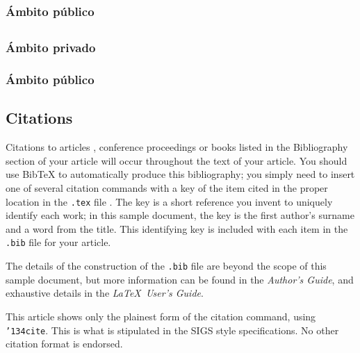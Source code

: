 \documentclass{vldb}
\begin{document}
\subsubsection{Ámbito público}

\subsubsubsection{}

\subsection{}

\subsubsection{Ámbito privado}

\subsubsubsection{}

\subsubsection{Ámbito público}

\subsubsubsection{}


\subsection{Citations}
Citations to articles \cite{bowman:reasoning, clark:pct, braams:babel, herlihy:methodology},
conference
proceedings \cite{clark:pct} or books \cite{salas:calculus, Lamport:LaTeX} listed
in the Bibliography section of your
article will occur throughout the text of your article.
You should use BibTeX to automatically produce this bibliography;
you simply need to insert one of several citation commands with
a key of the item cited in the proper location in
the \texttt{.tex} file \cite{Lamport:LaTeX}.
The key is a short reference you invent to uniquely
identify each work; in this sample document, the key is
the first author's surname and a
word from the title.  This identifying key is included
with each item in the \texttt{.bib} file for your article.

The details of the construction of the \texttt{.bib} file
are beyond the scope of this sample document, but more
information can be found in the \textit{Author's Guide},
and exhaustive details in the \textit{\LaTeX\ User's
Guide}\cite{Lamport:LaTeX}.

This article shows only the plainest form
of the citation command, using \texttt{{\char'134}cite}.
This is what is stipulated in the SIGS style specifications.
No other citation format is endorsed.
\end{document}
